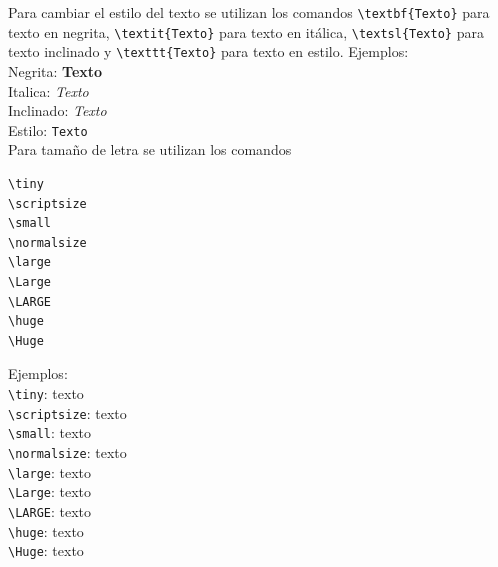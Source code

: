 \documentclass[10pt,journal,compsoc]{IEEEtran}
\begin{document}
Para cambiar el estilo del texto se utilizan los comandos \verb|\textbf{Texto}| para texto en negrita, \verb|\textit{Texto}| para texto en it\'alica, \verb|\textsl{Texto}| para texto inclinado y \verb|\texttt{Texto}| para texto en estilo. Ejemplos:\\
Negrita: \textbf{Texto}\\
Italica: \textit{Texto}\\
Inclinado: \textsl{Texto}\\
Estilo: \texttt{Texto}\\
Para tama\~no de letra se utilizan los comandos
\begin{lstlisting}
\tiny
\scriptsize
\small
\normalsize
\large
\Large
\LARGE
\huge
\Huge
\end{lstlisting}
Ejemplos:\\
\verb|\tiny|: \tiny texto\\\normalsize
\verb|\scriptsize|: \scriptsize texto\\\normalsize
\verb|\small|: \small texto\\\normalsize
\verb|\normalsize|: \normalsize texto\\\normalsize
\verb|\large|: \large texto\\\normalsize
\verb|\Large|: \Large texto\\\normalsize
\verb|\LARGE|: \LARGE texto\\\normalsize
\verb|\huge|: \huge texto\\\normalsize
\verb|\Huge|: \Huge texto\\\normalsize
\normalsize
\end{document}
